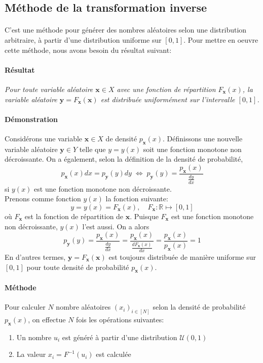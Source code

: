 \documentclass[a4paper]{article}
\begin{document}
\subsection{Méthode de la transformation inverse}
\paragraph{}
C'est une méthode pour générer des nombres aléatoires
selon une distribution arbitraire, à partir d'une distribution uniforme
sur \([0,1]\). Pour mettre en oeuvre cette méthode, nous avons besoin du
résultat suivant:
\paragraph{Résultat}
\emph{Pour toute variable aléatoire \(\mathbf x\in X\) avec une fonction
de répartition \(F_{\mathbf x}(x)\), la variable aléatoire
\(\mathbf y=F_{\mathbf x}(\mathbf x)\) est distribuée uniformément sur
l'intervalle \([0,1]\).}
\paragraph{Démonstration}
Considérons une variable \(\mathbf x\in X\) de densité
\(p_{\mathbf x}(x)\). Définissons une nouvelle variable aléatoire
\(\mathbf y\in Y\) telle que \(y=y(x)\) soit une fonction monotone non
décroissante. On a également, selon la définition de la densité de
probabilité,
\[
	p_{\mathbf x}(x)dx=p_{\mathbf y}(y)dy \;\Leftrightarrow\;
	p_{\mathbf y}(y) = \frac{p_{\mathbf x}(x)}{\frac{dy}{dx}}
\]
si \(y(x)\) est une fonction monotone non décroissante.\\
Prenons comme fonction \(y(x)\) la fonction suivante:
\[y=y(x)=F_{\mathbf x}(x),\quad F_{\mathbf x}:\mathbb{R}\mapsto[0,1]\]
où \(F_{\mathbf x}\) est la fonction de répartition de \(\mathbf x\).
Puisque \(F_{\mathbf x}\) est une fonction monotone non décroissante,
\(y(x)\) l'est aussi.
On a alors
\[
	p_{\mathbf y}(y) = \frac{p_{\mathbf x}(x)}{\frac{dy}{dx}}=
	\frac{p_{\mathbf x}(x)}{\frac{dF_{\mathbf x}(x)}{dx}}=
	\frac{p_{\mathbf x}(x)}{p_{\mathbf x}(x)}=1
\]
En d'autres termes, \(\mathbf y=F_{\mathbf x}(\mathbf x)\) est toujours
distribuée de manière uniforme sur \([0,1]\) pour toute densité de
probabilité \(p_{\mathbf x}(x)\).
\paragraph{Méthode} Pour calculer \(N\) nombre aléatoires
\((x_i)_{i\in[N]}\) selon la densité de probabilité \(p_{\mathbf x}(x)\),
on effectue \(N\) fois les opérations suivantes:
\begin{enumerate}
	\item Un nombre \(u_i\) est généré à partir d'une distribution
		\(\mathcal U(0,1)\)
	\item La valeur \(x_i=F^{-1}(u_i)\) est calculée
\end{enumerate}
\end{document}
